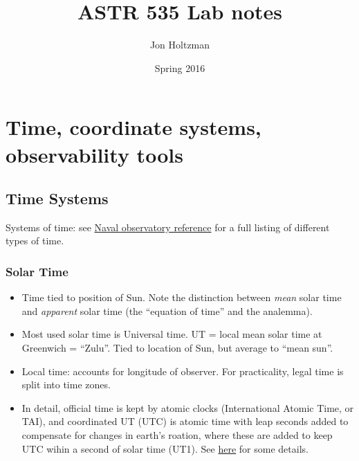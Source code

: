 \documentclass[12pt]{article}
\title{ASTR 535 Lab notes}
\author{Jon Holtzman}
\date{Spring 2016}
\begin{document}
\maketitle

\section*{Time, coordinate systems, observability tools}
\subsection*{Time Systems}
Systems of time: see \textcolor{blue}{\href{tycho.usno.navy.mil/systime.html}
        {Naval observatory reference}}
        for a full listing of different types of time.
    \subsubsection*{Solar Time}
        \begin{itemize}
            \item Time tied to position of Sun. Note the distinction
                between \textit{mean} solar time and \textit{apparent}
                solar time (the ``equation of time'' and the analemma).
            \item Most used solar time is Universal time.
                UT = local mean solar time at Greenwich = ``Zulu''.
                Tied to location of Sun, but average to ``mean sun''.
            \item Local time: accounts for longitude of observer.
                For practicality, legal time is split into time zones.
            \item In detail, official time is kept by atomic clocks
                (International Atomic Time, or TAI), and coordinated UT
                (UTC) is atomic time with leap seconds added to compensate
                for changes in earth's roation, where these are added to
                keep UTC wihin a second of solar time (UT1).
                See \textcolor{blue}
                {\href{https://en.wikipedia.org/wiki/Universal_Time}
                {here}}
                for some details.
        \end{itemize}
\end{document}
